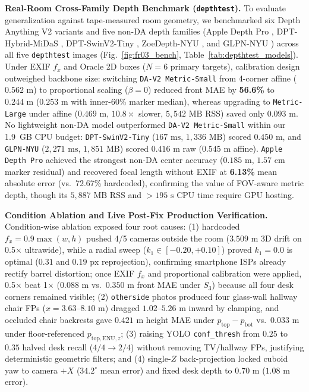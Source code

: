 \documentclass[conference]{IEEEtran}
\begin{document}
\textbf{Real-Room Cross-Family Depth Benchmark (\texttt{depthtest}).} To evaluate generalization against tape-measured room geometry, we benchmarked six Depth Anything V2 variants and five non-DA depth families (Apple Depth Pro \cite{b11}, DPT-Hybrid-MiDaS \cite{b12}, DPT-SwinV2-Tiny \cite{b12}, ZoeDepth-NYU \cite{b13}, and GLPN-NYU \cite{b14}) across all five \texttt{depthtest} images (Fig.~\ref{fig:fr03_bench}, Table~\ref{tab:depthtest_models}). Under EXIF $f_x$ and Oracle 2D boxes ($N=6$ primary targets), calibration design outweighed backbone size: switching \texttt{DA-V2 Metric-Small} from 4-corner affine ($0.562\text{ m}$) to proportional scaling ($\beta=0$) reduced front MAE by \textbf{56.6\%} to $0.244\text{ m}$ ($0.253\text{ m}$ with inner-60\% marker median), whereas upgrading to \texttt{Metric-Large} under affine ($0.469\text{ m}$, $10.8\times$ slower, $5{,}542\text{ MB}$ RSS) saved only $0.093\text{ m}$. No lightweight non-DA model outperformed \texttt{DA-V2 Metric-Small} within our 1.9~GB CPU budget: \texttt{DPT-SwinV2-Tiny} ($167\text{ ms}$, $1{,}336\text{ MB}$) scored $0.450\text{ m}$, and \texttt{GLPN-NYU} ($2{,}271\text{ ms}$, $1{,}851\text{ MB}$) scored $0.416\text{ m}$ raw ($0.545\text{ m}$ affine). \texttt{Apple Depth Pro} achieved the strongest non-DA center accuracy ($0.185\text{ m}$, $1.57\text{ cm}$ marker residual) and recovered focal length without EXIF at \textbf{6.13\%} mean absolute error (vs.\ 72.67\% hardcoded), confirming the value of FOV-aware metric depth, though its $5{,}887\text{ MB}$ RSS and $>195\text{ s}$ CPU time require GPU hosting.

\textbf{Condition Ablation and Live Post-Fix Production Verification.} Condition-wise ablation exposed four root causes: (1) hardcoded $f_x = 0.9\max(w, h)$ pushed 4/5 cameras outside the room ($3.509\text{ m}$ 3D drift on 0.5$\times$ ultrawide), while a radial sweep ($k_1 \in [-0.20, +0.10]$) proved $k_1=0.0$ is optimal ($0.31$ and $0.19\text{ px}$ reprojection), confirming smartphone ISPs already rectify barrel distortion; once EXIF $f_x$ and proportional calibration were applied, 0.5$\times$ beat 1$\times$ ($0.088\text{ m}$ vs.\ $0.350\text{ m}$ front MAE under $S_3$) because all four desk corners remained visible; (2) \texttt{otherside} photos produced four glass-wall hallway chair FPs ($x=3.63$--$8.10\text{ m}$) dragged $1.02$--$5.26\text{ m}$ inward by clamping, and occluded chair backrests gave $0.421\text{ m}$ height MAE under $p_{\mathrm{top}}-p_{\mathrm{bot}}$ vs.\ $0.033\text{ m}$ under floor-referenced $p_{\mathrm{top,ENU},z}$; (3) raising YOLO \texttt{conf\_thresh} from $0.25$ to $0.35$ halved desk recall ($4/4 \to 2/4$) without removing TV/hallway FPs, justifying deterministic geometric filters; and (4) single-$Z$ back-projection locked cuboid yaw to camera $+X$ ($34.2^\circ$ mean error) and fixed desk depth to $0.70\text{ m}$ ($1.08\text{ m}$ error).
\end{document}
